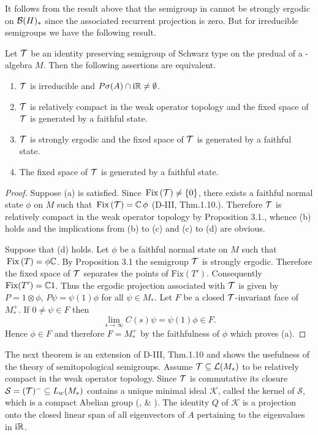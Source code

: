It follows from the result above that the semigroup in \citet{evans:1977} cannot be strongly ergodic on $\mathcal{B}(H)_{*}$ since the associated recurrent projection is zero.
But for irreducible semigroups we have the following result.
\begin{proposition}\label{prop:d4-3.4}
Let $\mathcal{T}$ be an identity preserving semigroup of Schwarz type on the predual of a \WA-algebra $M$.
Then the following assertions are equivalent.
\begin{enumerate}[\upshape (a)]
\item
$\mathcal{T}$ is irreducible and $P\sigma(A) \cap \mathrm{i}\mathbb{R} \neq \emptyset$.

\item
$\mathcal{T}$ is relatively compact in the weak operator topology and the fixed space of\/ $\mathcal{T}$ is generated by a faithful state.

\item
$\mathcal{T}$ is strongly ergodic and the fixed space of\/ $\mathcal{T}$ is generated by a faithful state.

\item
The fixed space of\/ $\mathcal{T}$ is generated by a faithful state.
\end{enumerate}
\end{proposition}
\begin{proof}
Suppose (a) is satisfied.
Since $\mathop{}\mathrm{Fix}\left(\mathcal{T}\right) \neq \{0\}$, there exists a faithful normal state $\phi$ on $M$ such that $\mathop{}\mathrm{Fix}\left(\mathcal{T}\right) = \mathbb{C} \,\phi$ (D-III, Thm.1.10.).
Therefore $\mathcal{T}$ is relatively compact in the weak operator topology by Proposition 3.1., whence (b) holds and the  implications from (b) to (c) and (c) to (d) are obvious.

Suppose that (d) holds.
Let $\phi$ be a faithful normal state on $M$ such that $\mathop{}\mathrm{Fix}\left(T\right) = \phi\mathbb{C}$.
By Proposition 3.1 the semigroup $\mathcal{T}$ is strongly ergodic.
Therefore the fixed space of\/ $\mathcal{T}$ separates the points of $\text{Fix}(T')$.
Consequently $\text{Fix}(T') = \mathbb{C}1$.
Thus the ergodic projection associated with $\mathcal{T}$ is given by $P = 1 \otimes \phi$, \ie $P\psi = \psi(1)\phi$ for all $\psi \in M_{*}$.
Let $F$ be a closed $\mathcal{T}$-invariant face of $M_{*}^{+}$.
If $0 \neq \psi \in F$ then
\[
\lim_{s \to \infty} C(s)\psi = \psi(1)\phi \in F.
\]
Hence $\phi \in F$ and therefore $F = M_{*}^{+}$ by the faithfulness of $\phi$ which proves (a).
\end{proof}
The next theorem is an extension of D-III, Thm.1.10 and shows the usefulness of the theory of semitopological semigroups.
Assume $\mathcal{T} \subseteq \mathcal{L}(M_{*})$ to be relatively compact in the weak operator topology. 
Since $\mathcal{T}$ is commutative its closure $\mathcal{S}  = (\mathcal{T})^{-} \subseteq L_{w}(M_{*})$ contains a unique minimal ideal $\mathcal{K}$, called the kernel of $\mathcal{S}$, which is a compact Abelian group (\citet{deleeuwglicksberg:1961}, \citet{junghenn:1971} \& \citet[§ 2.4]{krengel:1985}).
The identity $Q$ of $\mathcal{K}$ is a projection onto the closed linear span of all eigenvectors of $ A $ pertaining to the eigenvalues in $ \mathrm{i} \mathbb{R} $. 

